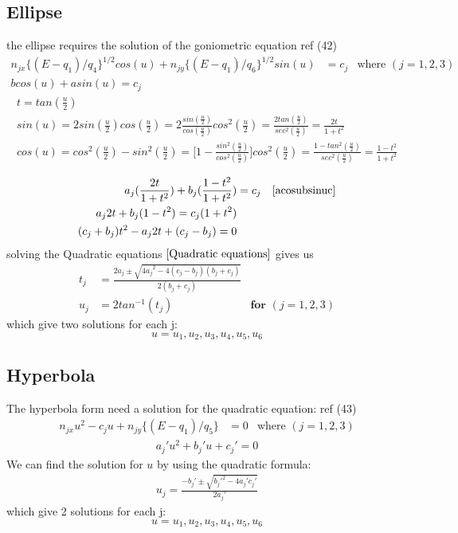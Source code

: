 \documentclass[11pt,a4paper]{article}
\begin{document}
\subsection{Ellipse}
the ellipse requires the solution of the goniometric equation ref (42)
\begin{align}
n_{jx}\{(E-q_1)/q_4 \}^{1/2}cos(u) + n_{jy}\{(E-q_1)/q_6\} ^ {1/2} sin (u)&= c_j&\text{where  } (j = 1,2,3)\\ b cos (u) + a sin (u)  =  c_j \label{acosubsinuc}
\end{align}
\begin{align}
 t = tan ( \frac{u}{2})\\
 sin (u) = 2sin (\frac{u}{2})cos (\frac{u}{2}) = 2 \frac{sin( \frac{u}{2})}{cos (\frac{u}{2})}cos ^2 (\frac{u}{2}) = \frac{2 tan (\frac{u}{2})}{sec ^2 (\frac{u}{2})} = \frac{2t}{1+ t^2} \\
 cos (u) = cos^2 (\frac{u}{2}) - sin^2 (\frac{u}{2}) = \Big[ 1- \frac{sin^2 (\frac{u}{2})}{cos^2 (\frac{u}{2})}\Big]cos^2 (\frac{u}{2}) = \frac{1- tan^2 (\frac{u}{2})}{sec^2 (\frac{u}{2})}  =\frac{1-t^2}{1+t^2}\\
\end{align}
\begin{align}
a_j(\frac{2t}{1+t^2})+ b_j(\frac{1-t^2}{1+t^2}) &= c_j  &\ref{acosubsinuc}\\
a_j2t + b_j(1-t^2) = c_j (1+t^2)\\
(c_j+b_j)t^2 - a_j 2t +(c_j-b_j)= 0 \label{Quadratic equations}
\end{align}
solving the Quadratic equations $\ref{Quadratic equations}$ gives us
\begin{align}
t_j &= \frac{2a_j \pm \sqrt{{4a_j}^2-4(c_j-b_j)(b_j+c_j)}}{2(b_j+c_j)} \\
u_j &= 2tan ^{-1} (t_j) & \textbf{for } (j = 1,2,3)
\end{align}
which give two solutions for each j:
\begin{equation}
u = u_1,u_2,u_3,u_4,u_5,u_6
\end{equation}

\subsection{Hyperbola}
The hyperbola form need a solution for the quadratic equation: ref (43)
\begin{align}
n_{jx}u^2 -c_j u + n_{jy}\{(E-q_1)/q_5\} &= 0  &\text{where  } (j = 1,2,3)
\end{align}
\begin{align}
a_j'u^2 + b_j'u + c_j' = 0
\end{align}
We can find the solution for $u$ by using the quadratic formula:
\begin{align}
u_j = \frac{-b_j ' \pm \sqrt{b_j '^2 - 4a_j'c_j'} }{2a_j'}
\end{align}
which give 2 solutions for each j:
\begin{equation}
u = u_1,u_2,u_3,u_4,u_5,u_6
\end{equation}
\end{document}
